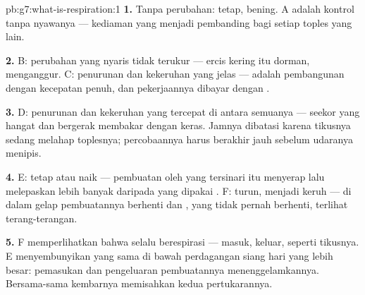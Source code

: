 \begin{solution}{pb:g7:what-is-respiration:1}
\textbf{1.} Tanpa perubahan:  tetap,  bening.
A adalah kontrol tanpa nyawanya --- kediaman yang menjadi pembanding
bagi setiap toples yang lain.

\textbf{2.} B: perubahan yang nyaris tidak terukur --- ercis kering
itu dorman,  menganggur. C: penurunan  dan
kekeruhan yang jelas ---  adalah pembangunan dengan
kecepatan penuh, dan pekerjaannya dibayar dengan .

\textbf{3.} D: penurunan dan kekeruhan yang tercepat di antara
semuanya --- seekor  yang hangat dan bergerak membakar dengan
keras. Jamnya dibatasi karena tikusnya sedang melahap 
toplesnya; percobaannya harus berakhir jauh sebelum udaranya menipis.

\textbf{4.} E:  tetap atau naik --- pembuatan oleh 
yang tersinari itu menyerap  lalu melepaskan 
lebih banyak daripada yang dipakai . F:  turun,
 menjadi keruh --- di dalam gelap pembuatannya berhenti
dan , yang tidak pernah berhenti, terlihat terang-terangan.

\textbf{5.} F memperlihatkan bahwa  selalu berespirasi ---
 masuk,  keluar, seperti tikusnya. E
menyembunyikan  yang sama di bawah perdagangan siang hari
yang lebih besar: pemasukan dan pengeluaran pembuatannya
menenggelamkannya. Bersama-sama kembarnya memisahkan kedua
pertukarannya.


\end{solution}
